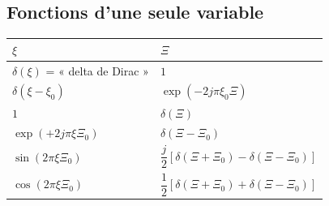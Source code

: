 \subsection{Fonctions d'une seule variable}

\begin{table}[h!]
  \centering
  \begin{tabularx}{\textwidth}{>{\centering\arraybackslash}X >{\centering\arraybackslash}X}
    \toprule
    $\xi$ & $\Xi$ \\
    \midrule
    $\delta(\xi)$ = « delta de Dirac » & $1$ \\[6pt]
    $\delta(\xi-\xi_0)$ & $\exp(-2j\pi\xi_0\Xi)$ \\[6pt]
    $1$ & $\delta(\Xi)$ \\[6pt]
    $\exp(+2j\pi\xi\Xi_0)$ & $\delta(\Xi-\Xi_0)$ \\[6pt]
    $\sin(2\pi\xi\Xi_0)$ &
      $\dfrac{j}{2}\left[\delta(\Xi+\Xi_0)-\delta(\Xi-\Xi_0)\right]$ \\[10pt]
    $\cos(2\pi\xi\Xi_0)$ &
      $\dfrac{1}{2}\left[\delta(\Xi+\Xi_0)+\delta(\Xi-\Xi_0)\right]$ \\
    \bottomrule
  \end{tabularx}
\end{table}

